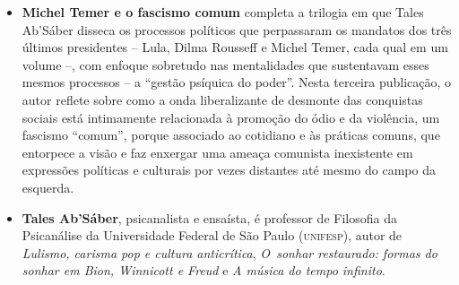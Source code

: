 \begin{itemize}


\item \textbf{Michel Temer e o fascismo comum} completa a trilogia em que Tales Ab'Sáber disseca
os processos políticos que perpassaram os mandatos dos três últimos presidentes -- Lula, Dilma
Rousseff e Michel Temer, cada qual em um volume --, com enfoque sobretudo nas mentalidades
que sustentavam esses mesmos processos -- a ``gestão psíquica do poder''.
Nesta terceira publicação, o autor reflete sobre como a onda liberalizante de desmonte das
conquistas sociais está intimamente relacionada à promoção do ódio e da violência, um fascismo
``comum'', porque associado ao cotidiano e às práticas comuns, que entorpece a visão
e faz enxergar uma ameaça comunista inexistente em expressões políticas e culturais
por vezes distantes até mesmo do campo da esquerda.
  
\item \textbf{Tales Ab’Sáber}, psicanalista e ensaísta, é professor de Filosofia da Psicanálise da Universidade Federal 
de São Paulo (\textsc{unifesp}), autor de 
\emph{Lulismo, carisma pop e cultura anticrítica},
\textit{O~sonhar
restaurado: formas do sonhar em Bion, Winnicott e Freud} e
\textit{A música do tempo infinito}. 

\end{itemize}

